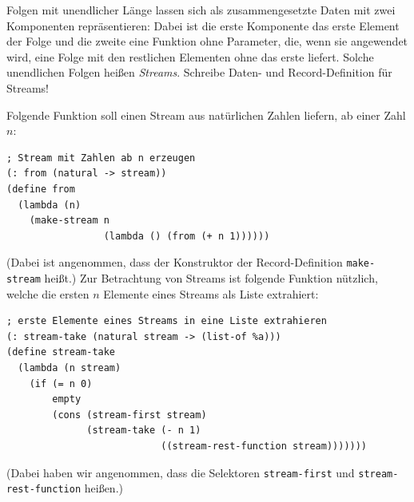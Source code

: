 \begin{aufgabe}
  Folgen mit unendlicher Länge lassen sich als
  zusammengesetzte Daten mit zwei Komponenten repräsentieren: Dabei
  ist die erste Komponente das erste Element der Folge und die zweite
  eine Funktion ohne Parameter, die, wenn sie angewendet wird, eine Folge mit
  den restlichen Elementen ohne das erste liefert.
  Solche unendlichen Folgen heißen \textit{Streams}.
  Schreibe Daten- und Record-Definition für Streams!

  Folgende Funktion soll einen Stream aus natürlichen Zahlen liefern,
  ab einer Zahl $n$:
\begin{lstlisting}
; Stream mit Zahlen ab n erzeugen
(: from (natural -> stream))
(define from
  (lambda (n)
    (make-stream n
                 (lambda () (from (+ n 1))))))
  \end{lstlisting}
  (Dabei ist angenommen, dass der Konstruktor der Record-Definition
  \lstinline{make-stream} heißt.)
  Zur Betrachtung von Streams ist folgende Funktion nützlich, welche
  die ersten $n$ Elemente eines Streams als Liste extrahiert:
\begin{lstlisting}
; erste Elemente eines Streams in eine Liste extrahieren
(: stream-take (natural stream -> (list-of %a)))
(define stream-take
  (lambda (n stream)
    (if (= n 0)
        empty
        (cons (stream-first stream)
              (stream-take (- n 1)
                           ((stream-rest-function stream)))))))
\end{lstlisting}
   (Dabei haben wir angenommen, dass die Selektoren
   \lstinline{stream-first} und \lstinline{stream-rest-function} heißen.)


\end{aufgabe}

